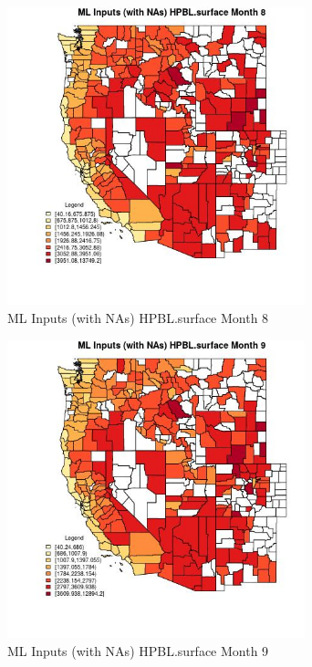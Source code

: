 \begin{figure} 
\centering  
\includegraphics[width=0.77\textwidth]{Code_Outputs/Report_ML_input_PM25_Step4_part_f_de_duplicated_aves_prioritize_24hr_obswNAs_CountyHPBLsurfacemedianMonth8.jpg} 
\caption{\label{fig:Report_ML_input_PM25_Step4_part_f_de_duplicated_aves_prioritize_24hr_obswNAsCountyHPBLsurfacemedianMonth8}ML Inputs (with NAs) HPBL.surface Month 8} 
\end{figure} 
 

\begin{figure} 
\centering  
\includegraphics[width=0.77\textwidth]{Code_Outputs/Report_ML_input_PM25_Step4_part_f_de_duplicated_aves_prioritize_24hr_obswNAs_CountyHPBLsurfacemedianMonth9.jpg} 
\caption{\label{fig:Report_ML_input_PM25_Step4_part_f_de_duplicated_aves_prioritize_24hr_obswNAsCountyHPBLsurfacemedianMonth9}ML Inputs (with NAs) HPBL.surface Month 9} 
\end{figure} 
 


